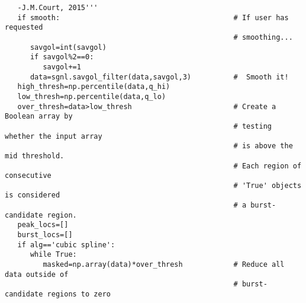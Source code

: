 \begin{verbatim}
   -J.M.Court, 2015'''
   if smooth:                                         # If user has requested
                                                      # smoothing...
      savgol=int(savgol)
      if savgol%2==0:
         savgol+=1
      data=sgnl.savgol_filter(data,savgol,3)          #  Smooth it!
   high_thresh=np.percentile(data,q_hi)
   low_thresh=np.percentile(data,q_lo)
   over_thresh=data>low_thresh                        # Create a Boolean array by
                                                      # testing whether the input array
                                                      # is above the mid threshold.
                                                      # Each region of consecutive
                                                      # 'True' objects is considered
                                                      # a burst-candidate region.
   peak_locs=[]
   burst_locs=[]
   if alg=='cubic spline':
      while True:                                                                                                               
         masked=np.array(data)*over_thresh            # Reduce all data outside of
                                                      # burst-candidate regions to zero


\end{verbatim}
